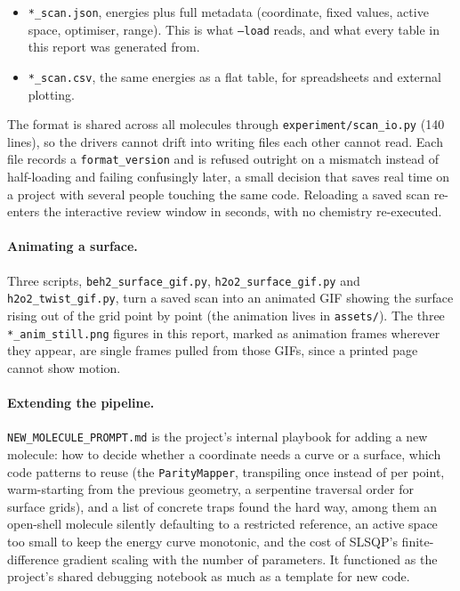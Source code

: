 \documentclass[sigconf,screen,nonacm]{acmart}
\begin{document}
\begin{itemize}[leftmargin=1.5em]
\item \texttt{*\_scan.json}, energies plus full metadata (coordinate, fixed
      values, active space, optimiser, range). This is what \texttt{--load}
      reads, and what every table in this report was generated from.
\item \texttt{*\_scan.csv}, the same energies as a flat table, for
      spreadsheets and external plotting.
\end{itemize}

The format is shared across all molecules through
\texttt{experiment/}\allowbreak\texttt{scan\_io.py} (140 lines), so the drivers cannot drift into
writing files each other cannot read. Each file records a
\texttt{format\_version} and is refused outright on a mismatch instead of
half-loading and failing confusingly later, a small decision that saves real
time on a project with several people touching the same code. Reloading a
saved scan re-enters the interactive review window in seconds, with no
chemistry re-executed.

\paragraph{Animating a surface.}
Three scripts, \texttt{beh2\_surface\_gif.py}, \texttt{h2o2\_surface\_gif.py}
and \texttt{h2o2\_twist\_gif.py}, turn a saved scan into an animated GIF
showing the surface rising out of the grid point by point (the animation
lives in \texttt{assets/}). The three \texttt{*\_anim\_still.png} figures in
this report, marked as animation frames wherever they appear, are single
frames pulled from those GIFs, since a printed page cannot show motion.

\paragraph{Extending the pipeline.}
\texttt{NEW\_MOLECULE\_PROMPT.md} is the project's internal playbook for
adding a new molecule: how to decide whether a coordinate needs a curve or a
surface, which code patterns to reuse (the \texttt{ParityMapper}, transpiling
once instead of per point, warm-starting from the previous geometry, a
serpentine traversal order for surface grids), and a list of concrete traps
found the hard way, among them an open-shell molecule silently defaulting to
a restricted reference, an active space too small to keep the energy curve
monotonic, and the cost of SLSQP's finite-difference gradient scaling with
the number of parameters. It functioned as the project's shared debugging
notebook as much as a template for new code.
\end{document}
